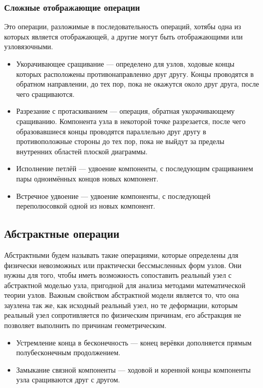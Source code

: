 \subsubsection{Сложные отображающие операции}
Это операции, разложимые в последовательность операций, хотябы одна из которых является отображающей, а другие могут быть отображающими или узловязочными.

\begin{itemize}
\item Укорачивающее сращивание --- определено для узлов, ходовые концы которых расположены противонаправленно друг другу. Концы проводятся в обратном направлении, до тех пор, пока не окажутся около друг друга, после чего сращиваются.
\item Разрезание с протаскиванием --- операция, обратная укорачивающему сращиванию. Компонента узла в некоторой точке разрезается, после чего образовавшиеся концы проводятся параллельно друг другу в противоположные стороны до тех пор, пока не выйдут за пределы внутренних областей плоской диаграммы.
\item Исполнение петлёй --- удвоение компоненты, с последующим сращиванием пары одноимённых концов новых компонент.
\item Встречное удвоение --- удвоение компоненты, с последующей переполюсовкой одной из новых компонент.
\end{itemize}

\subsection{Абстрактные операции}

Абстрактными будем называть такие операциями, которые определены для физически невозможных или практически бессмысленных форм узлов. Они нужны для того, чтобы иметь возможность сопоставить реальный узел с абстрактной моделью узла, пригодной для анализа методами математической теории узлов. Важным свойством абстрактной модели является то, что она заузлена так же, как исходный реальный узел, но те деформации, которым реальный узел сопротивляется по физическим причинам, его абстракция не позволяет выполнить по причинам геометрическим.

\begin{itemize}
\item Устремление конца в бесконечность --- конец верёвки дополняется прямым полубесконечным продолжением.
\item Замыкание связной компоненты --- ходовой и коренной концы компоненты узла сращиваются друг с другом.
\end{itemize}
